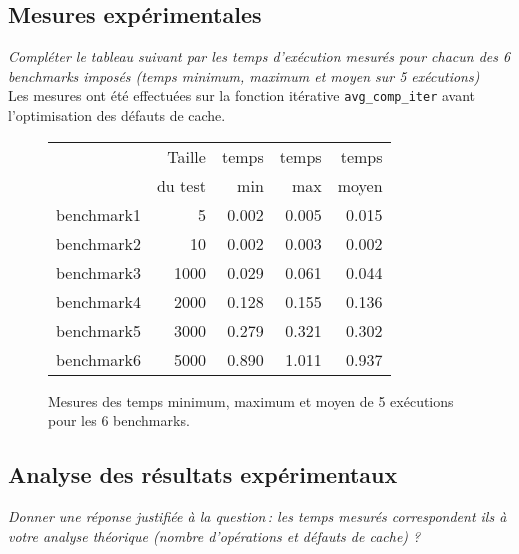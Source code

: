 \documentclass[a4paper, 10pt, french]{article}
\begin{document}
  \subsection{Mesures expérimentales}
	{\em Compléter le tableau suivant par les temps d'exécution mesurés pour chacun des 6 benchmarks imposés
			  (temps minimum, maximum et moyen sur 5 exécutions)
	}\\
	{Les mesures ont été effectuées sur la fonction itérative \verb?avg_comp_iter? avant l'optimisation des défauts de cache.}

	\begin{figure}[h]
		\begin{center}
			\begin{tabular}{|l||r||r|r|r||}
				\hline
				\hline
				& Taille         & temps     & temps   & temps \\
				& du test     & min       & max     & moyen \\
				\hline
				\hline
				benchmark1 & 5   & 0.002     & 0.005   & 0.015 \\
				\hline
				benchmark2 & 10  & 0.002     & 0.003   & 0.002 \\
				\hline
				benchmark3 & 1000  & 0.029     & 0.061   & 0.044 \\
				\hline
				benchmark4 & 2000  & 0.128    & 0.155    & 0.136 \\
				\hline
				benchmark5 & 3000  & 0.279    & 0.321    & 0.302 \\
				\hline
				benchmark6 & 5000  & 0.890    & 1.011    & 0.937 \\
				\hline
				\hline
			\end{tabular}
			\caption{Mesures des temps minimum, maximum et moyen de 5 exécutions pour les 6 benchmarks.}
			\label{table-temps}
		\end{center}
	\end{figure}

\subsection{Analyse des résultats expérimentaux}
{\em Donner  une réponse justifiée  à la question\,: 
			  les  temps mesurés correspondent ils  à votre analyse théorique (nombre d’opérations et défauts de cache) ?
}
\end{document}
